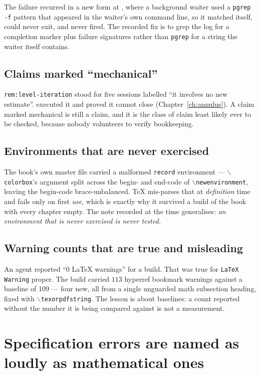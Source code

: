 The failure recurred in a new form at , where a background waiter used
a \texttt{pgrep -f} pattern that appeared in the waiter's own command line, so
it matched itself, could never exit, and never fired. The recorded fix is to
grep the log for a completion marker plus failure signatures rather than
\texttt{pgrep} for a string the waiter itself contains.

\subsection{Claims marked ``mechanical''}

\texttt{rem:level-iteration} stood for five sessions labelled ``it involves no
new estimate''.  executed it and proved it cannot close
(Chapter~\ref{ch:annulus}). A claim marked mechanical is still a claim, and it
is the class of claim least likely ever to be checked, because nobody
volunteers to verify bookkeeping.

\subsection{Environments that are never exercised}

The book's own master file carried a malformed \texttt{record} environment ---
\(\backslash\)\texttt{colorbox}'s argument split across the begin- and
end-code of \(\backslash\)\texttt{newenvironment}, leaving the begin-code
brace-unbalanced. \TeX{} mis-parses that at \emph{definition} time and fails
only on first \emph{use}, which is exactly why it survived a build of the book
with every chapter empty. The note recorded at the time generalises: \emph{an
environment that is never exercised is never tested.}

\subsection{Warning counts that are true and misleading}

An agent reported ``0 LaTeX warnings'' for a build. That was true for
\texttt{LaTeX Warning} proper. The build carried \(113\) hyperref bookmark
warnings against a baseline of \(109\) --- four new, all from a single
unguarded math subsection heading, fixed with
\(\backslash\)\texttt{texorpdfstring}. The lesson is about baselines: a count
reported without the number it is being compared against is not a measurement.

\section{Specification errors are named as loudly as mathematical ones}
\label{sec:spec-errors}

